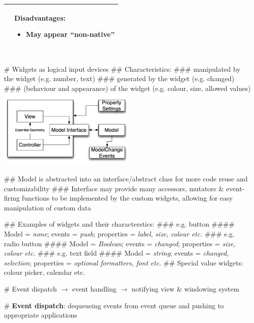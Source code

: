 \documentclass[11pt, oneside]{article}
\newcommand*{\un}[1]{\underline{\smash{#1}}}        %
\newenvironment{itemized}{\begin{itemize}[noitemsep, topsep=0pt, leftmargin=*]}{\end{itemize}}  %
\begin{document}
\begin{tabular}{|l|l|}
\begin{minipage}[t]{0.45\textwidth}
\begin{itemized}
    \end{itemized}
    \vspace*{0.5em}
\end{minipage}
&
\begin{minipage}[t]{0.45\textwidth}
Disadvantages:
    \begin{itemized}
        \item May appear ``non-native''
    \end{itemized}
    \vspace*{0.5em}
\end{minipage}  \\
\hline
\end{tabular} \\

# Widgets as logical input devices
## Characteristics:
### \un{Model} manipulated by the widget (e.g. number, text)
### \un{Events} generated by the widget (e.g. changed)
### \un{Properties} (behaviour and appearance) of the widget (e.g. colour, size, allowed values) \\
\includegraphics[width=0.5\textwidth]{res/mvc_widget.png}

## Model is abstracted into an interface/abstract class for more code reuse and customizability
### Interface may provide many accessors, mutators \& event-firing functions to be implemented by the custom widgets, allowing for easy manipulation of custom data

## Examples of widgets and their characterstics:
### e.g. button
#### Model = \emph{none}; events = \emph{push}; properties = \emph{label, size, colour etc.}
### e.g. radio button
#### Model = \emph{Boolean}; events = \emph{changed}; properties = \emph{size, colour etc.}
### e.g. text field
#### Model = \emph{string}; events = \emph{changed, selection}; properties = \emph{optional formatters, font etc.}
## Special value widgets: colour picker, calendar etc.


# Event dispatch $\rightarrow$ event handling $\rightarrow$ notifying view \& windowing system

# \textbf{Event dispatch}: dequeueing events from event queue and pushing to appropriate applications
\end{document}
